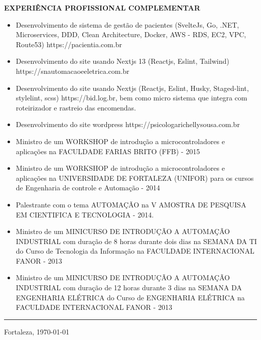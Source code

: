 \documentclass[12pt, a4paper]{article}
\newcommand{\LlinhaG}{2pt} %
\newcommand{\TlinhaG}{17cm}  %
\begin{document}
\begin{center}
	\textbf{EXPERIÊNCIA PROFISSIONAL COMPLEMENTAR}\\
\end{center}
\begin{itemize}
	\item Desenvolvimento de sistema de gestão de pacientes (SvelteJs, Go, .NET, Microservices, DDD, Clean Architecture, Docker, AWS - RDS, EC2, VPC, Route53) https://pacientia.com.br
	\item Desenvolvimento do site usando Nextjs 13 (Reactjs, Eslint, Tailwind) https://snautomacaoeeletrica.com.br
	\item Desenvolvimento do site usando Nextjs (Reactjs, Eslint, Husky, Staged-lint, stylelint, scss) https://bid.log.br, bem como micro sistema que integra com roteirizador e rastreio das encomendas.
	\item Desenvolvimento do site wordpress https://psicologarichellysousa.com.br
	\item Ministro de um WORKSHOP  de introdução a microcontroladores e aplicações na FACULDADE FARIAS BRITO (FFB) - 2015
	\item Ministro de um WORKSHOP  de introdução a microcontroladores e aplicações na UNIVERSIDADE DE FORTALEZA (UNIFOR) para os cursos de Engenharia de controle e Automação - 2014
	\item Palestrante com o tema AUTOMAÇÃO  na V AMOSTRA DE PESQUISA EM CIENTIFICA E TECNOLOGIA - 2014.
	\item Ministro de um MINICURSO DE INTRODUÇÃO A AUTOMAÇÃO INDUSTRIAL com duração de 8 horas durante dois dias na SEMANA DA TI do Curso de Tecnologia da Informação na FACULDADE INTERNACIONAL FANOR - 2013
	\item Ministro de um MINICURSO DE INTRODUÇÃO A AUTOMAÇÃO INDUSTRIAL com duração de 12 horas durante 3 dias na SEMANA DA ENGENHARIA ELÉTRICA do Curso de ENGENHARIA ELÉTRICA na FACULDADE INTERNACIONAL FANOR - 2013
\end{itemize}

\begin{center}
	\rule{\TlinhaG}{\LlinhaG}
\end{center}

\vspace{5cm}
\begin{center}
	\noindent Fortaleza, \today  %
\end{center}
\end{document}
